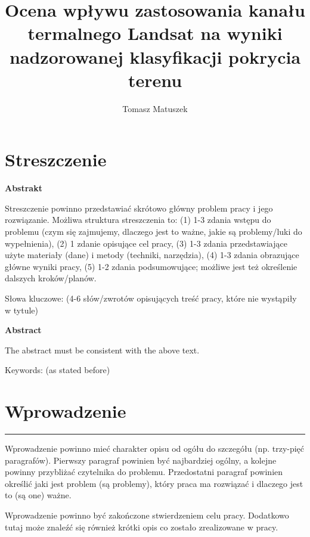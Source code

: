 \documentclass{amuthesis}
\author{Tomasz Matuszek}
\title{Ocena wpływu zastosowania kanału termalnego Landsat na wyniki
nadzorowanej klasyfikacji pokrycia terenu}
\begin{document}

\titlepage


\hypertarget{streszczenie}{%
\chapter*{Streszczenie}\label{streszczenie}}

\textbf{Abstrakt}

Streszczenie powinno przedstawiać skrótowo główny problem pracy i jego
rozwiązanie. Możliwa struktura streszczenia to: (1) 1-3 zdania wstępu do
problemu (czym się zajmujemy, dlaczego jest to ważne, jakie są
problemy/luki do wypełnienia), (2) 1 zdanie opisujące cel pracy, (3) 1-3
zdania przedstawiające użyte materiały (dane) i metody (techniki,
narzędzia), (4) 1-3 zdania obrazujące główne wyniki pracy, (5) 1-2
zdania podsumowujące; możliwe jest też określenie dalszych
kroków/planów.

Słowa kluczowe: (4-6 słów/zwrotów opisujących treść pracy, które nie
wystąpiły w tytule)

\textbf{Abstract}

The abstract must be consistent with the above text.

Keywords: (as stated before)

\newpage

\sf\tighttoc\doublespacing


\hypertarget{sec-wprowadzenie}{%
\chapter{Wprowadzenie}\label{sec-wprowadzenie}}

\begin{center}\rule{0.5\linewidth}{0.5pt}\end{center}

Wprowadzenie powinno mieć charakter opisu od ogółu do szczegółu (np.
trzy-pięć paragrafów). Pierwszy paragraf powinien być najbardziej
ogólny, a kolejne powinny przybliżać czytelnika do problemu.
Przedostatni paragraf powinien określić jaki jest problem (są problemy),
który praca ma rozwiązać i dlaczego jest to (są one) ważne.

Wprowadzenie powinno być zakończone stwierdzeniem celu pracy. Dodatkowo
tutaj może znaleźć się również krótki opis co zostało zrealizowane w
pracy.
\end{document}
